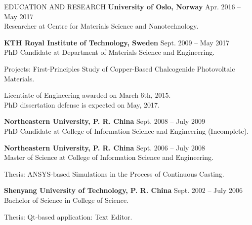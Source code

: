 \documentclass{resume} %
\begin{document}
\begin{rSection}{EDUCATION AND RESEARCH}
{\bf University of Oslo, Norway} \hfill {Apr. 2016 -- May 2017} \\ 
Researcher at Centre for Materials Science and Nanotechnology.


{\bf KTH Royal Institute of Technology, Sweden} \hfill { Sept. 2009 -- May 2017} \\ 
PhD Candidate at Department of Materials Science and Engineering.

Projects: First-Principles Study of Copper-Based Chalcogenide Photovoltaic Materials.

Licentiate of Engineering awarded on March 6th, 2015.\\
PhD dissertation defense is expected on May, 2017.

{\bf Northeastern University, P. R. China} \hfill { Sept. 2008 -- July 2009} \\ 
PhD Candidate at College of Information Science and Engineering (Incomplete).

{\bf Northeastern University, P. R. China} \hfill { Sept. 2006 -- July 2008} \\ 
Master of Science at College of Information Science and Engineering. 

Thesis: ANSYS-based Simulations in the Process of Continuous Casting.

{\bf Shenyang University of Technology, P. R. China} \hfill { Sept. 2002 -- July 2006} \\ 
Bachelor of Science in College of Science.


Thesis: Qt-based application: Text Editor.

\end{rSection}
\end{document}

